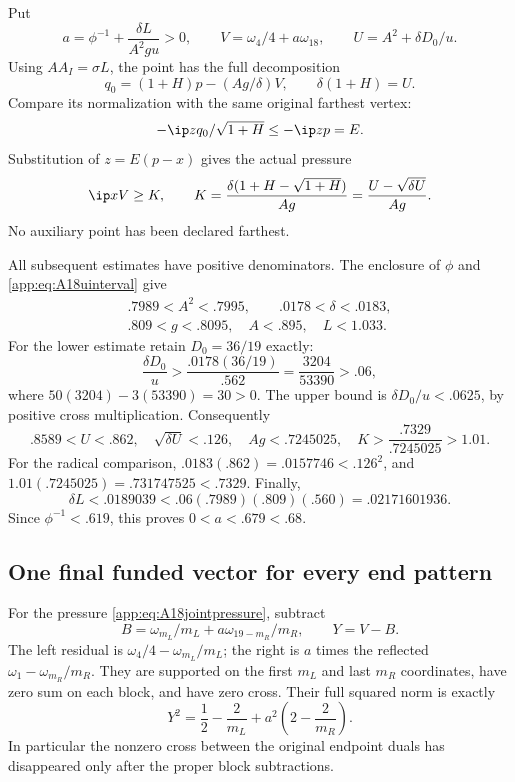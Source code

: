 Put
\[
 a=\phi^{-1}+\frac{\delta L}{A^2gu}>0,\qquad
 V=\omega_4/4+a\omega_{18},\qquad
 U=A^2+\delta D_0/u .
\]
Using \(AA_I=\sigma L\), the point has the full decomposition
\[
 q_0=(1+H)p-(Ag/\delta)V,\qquad
 \delta(1+H)=U.
\]
Compare its normalization with the same original farthest vertex:
\[
 -\ip z{q_0/\sqrt{1+H}}\leq-\ip zp=E .
\]
Substitution of \(z=E(p-x)\) gives the actual pressure
\begin{equation}\label{app:eq:A18jointpressure}
 \ip xV\geq K,\qquad
 K=\frac{\delta(1+H-\sqrt{1+H})}{Ag}
   =\frac{U-\sqrt{\delta U}}{Ag}.
\end{equation}
No auxiliary point has been declared farthest.

All subsequent estimates have positive denominators. The enclosure
of \(\phi\) and \eqref{app:eq:A18uinterval} give
\[
\begin{gathered}
 .7989<A^2<.7995,\qquad .0178<\delta<.0183,\\
 .809<g<.8095,\quad A<.895,\quad L<1.033 .
\end{gathered}
\]
For the lower estimate retain \(D_0=36/19\) exactly:
\[
 \frac{\delta D_0}{u}
  >\frac{.0178(36/19)}{.562}
   =\frac{3204}{53390}>.06 ,
\]
where \(50(3204)-3(53390)=30>0\).
The upper bound is \(\delta D_0/u<.0625\), by positive
cross multiplication. Consequently
\[
 .8589<U<.862,\quad
 \sqrt{\delta U}<.126,\quad
 Ag<.7245025,\quad
 K>\frac{.7329}{.7245025}>1.01 .
\]
For the radical comparison,
\(.0183(.862)=.0157746<.126^2\), and
\(1.01(.7245025)=.731747525<.7329\).
Finally,
\[
 \delta L<.0189039
 <.06(.7989)(.809)(.560)=.02171601936 .
\]
Since \(\phi^{-1}<.619\), this proves \(0<a<.679<.68\).

\subsection{One final funded vector for every end pattern}
\label{app:A18lastpayment}
For the pressure \eqref{app:eq:A18jointpressure}, subtract
\[
 B=\omega_{m_L}/m_L+a\omega_{19-m_R}/m_R,\qquad Y=V-B.
\]
The left residual is \(\omega_4/4-\omega_{m_L}/m_L\);
the right is \(a\) times the reflected
\(\omega_1-\omega_{m_R}/m_R\).
They are supported on the first \(m_L\) and last \(m_R\)
coordinates, have zero sum on each block, and have zero cross.
Their full squared norm is exactly
\[
 Y^2=\frac12-\frac2{m_L}
          +a^2\left(2-\frac2{m_R}\right).
\]
In particular the nonzero cross between the original endpoint
duals has disappeared only after the proper block subtractions.

